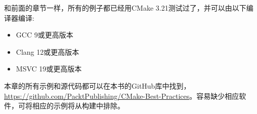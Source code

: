 和前面的章节一样，所有的例子都已经用CMake 3.21测试过了，并可以由以下编译器编译:

\begin{itemize}
\item 
GCC 9或更高版本

\item 
Clang 12或更高版本

\item 
MSVC 19或更高版本
\end{itemize}

本章的所有示例和源代码都可以在本书的GitHub库中找到，\url{https://github.com/PacktPublishing/CMake-Best-Practices}。容易缺少相应软件，可将相应的示例将从构建中排除。










